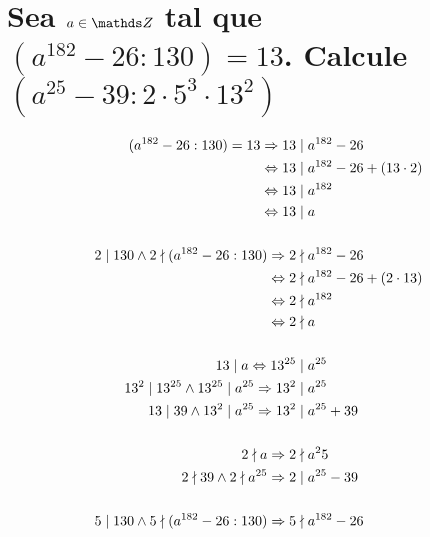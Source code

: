 \documentclass[a4paper,spanish]{article}
\begin{document}
\newpage
\section{%
  Sea $a \in \Z$ tal que $(a^{182}-26:130) = 13$. %
  Calcule $(a^{25}-39:2 \cdot 5^3 \cdot 13^2)$%
}

\newcommand{\equivfive}{\underset{(5)}\equiv}
\newcommand{\nequivfive}{\underset{(5)}\equiv}

  \begin{align*}
    (a^{182}-26:130) = 13 \then 13   &\mid a^{182}-26                       \\
                            \iif 13   &\mid a^{182} - 26 + (13 \cdot 2)     \\
                            \iif 13   &\mid a^{182}                         \\
                            \iif 13   &\mid a                               \\
    \\
    2 \mid 130 \land 2 \nmid (a^{182}-26:130) %
                          \then 2     &\nmid a^{182}-26                     \\
                            \iif 2    &\nmid a^{182} - 26 + (2 \cdot 13)    \\
                            \iif 2    &\nmid a^{182}                        \\
                            \iif 2    &\nmid a                              \\
    \\
                            13 \mid a \iif 13^{25} &\mid a^{25}             \\
    13^2 \mid 13^{25} \land 13^{25} \mid a^{25} %
                           \then 13^2 &\mid a^{25}                          \\
    13 \mid 39 \land 13^2 \mid a^{25} %
                           \then 13^2 &\mid a^{25} + 39                     \\
    \\
                    2 \nmid a \then 2 &\nmid a^25                           \\
    2 \nmid 39 \land 2 \nmid a^{25} %
                              \then 2 &\mid a^{25} - 39                     \\
    \\
    5 \mid 130 \land 5 \nmid (a^{182}-26:130) %
                              \then 5 &\nmid a^{182} - 26
  \end{align*}
\end{document}
